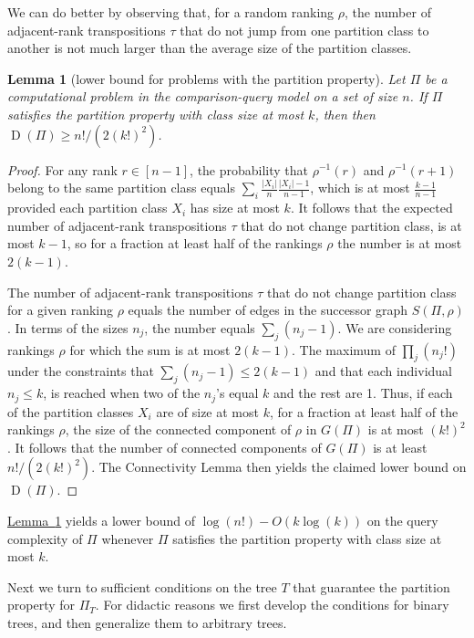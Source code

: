 \documentclass[11pt]{article}
\numberwithin{equation}{section}
\newtheorem{lemma}[theorem]{Lemma}
\theoremstyle{definition}
\theoremstyle{plain}
\newcommand{\expref}[2]{\hyperref[#2]{#1~\ref{#2}}}
\newcommand{\ranking}{\rho}
\newcommand{\transposition}{\tau}
\DeclareMathOperator{\traces}{D}
\begin{document}
We can do better by observing that, for a random ranking $\ranking$, the number of adjacent-rank transpositions $\transposition$ that do not jump from one partition class to another is not much larger than the average size of the partition classes.
\begin{lemma}[lower bound for problems with the partition property]\label{lemma:connectivity:sensitive}
Let $\Pi$ be a computational problem in the comparison-query model on a set of size $n$. If $\Pi$ satisfies the partition property with class size at most $k$, then then $\traces(\Pi) \ge n!/(2(k!)^2)$.
\end{lemma}
\begin{proof}
For any rank $r \in [n-1]$, the probability that $\ranking^{-1}(r)$ and $\ranking^{-1}(r+1)$ belong to the same partition class equals $\sum_i \frac{|X_i|}{n} \frac{|X_i|-1}{n-1}$, which is at most $\frac{k-1}{n-1}$ provided each partition class $X_i$ has size at most $k$. It follows that the expected number of adjacent-rank transpositions $\transposition$ that do not change partition class, is at most $k-1$, so for a fraction at least half of the rankings $\ranking$ the number is at most $2(k-1)$.

The number of adjacent-rank transpositions $\transposition$ that do not change partition class for a given ranking $\ranking$ equals the number of edges in the successor graph $S(\Pi,\ranking)$. In terms of the sizes $n_j$, the number equals $\sum_j (n_j-1)$. We are considering rankings $\ranking$ for which the sum is at most $2(k-1)$. The maximum of $\prod_j (n_j!)$ under the constraints that $\sum_j (n_j-1) \le 2(k-1)$ and that each individual $n_j \le k$, is reached when two of the $n_j$'s equal $k$ and the rest are 1. Thus, if each of the partition classes $X_i$ are of size at most $k$, for a fraction at least half of the rankings $\ranking$, the size of the connected component of $\ranking$ in $G(\Pi)$ is at most $(k!)^2$. It follows that the number of connected components of $G(\Pi)$ is at least $n!/(2(k!)^2)$. The Connectivity Lemma then yields the claimed lower bound on $\traces(\Pi)$.
\end{proof}

\expref{Lemma}{lemma:connectivity:sensitive} yields a lower bound of $\log(n!) - O(k \log(k))$ on the query complexity of $\Pi$ whenever $\Pi$ satisfies the partition property with class size at most $k$. 

Next we turn to sufficient conditions on the tree $T$ that guarantee the partition property for $\Pi_T$. For didactic reasons we first develop the conditions for binary trees, and then generalize them to arbitrary trees.
\end{document}
